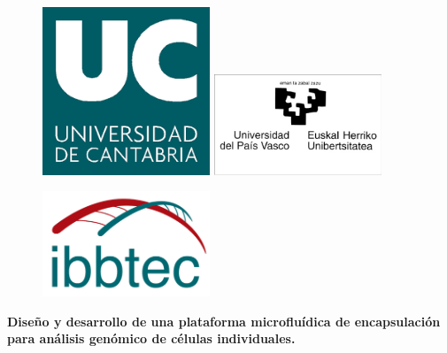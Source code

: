 \begin{titlepage}

    \begin{center}
    \vspace*{0.5in}
    
    \begin{figure}[htb]
        \begin{center}
            
            \includegraphics[width=5cm]{00_portada/UC.png}
            \hspace{2mm}
            \includegraphics[width=5cm]{00_portada/upv.jpg}   
            
            \vspace{2mm}
             
            \includegraphics[width=5cm]{00_portada/ibbtec.png}
            
        \end{center}
    \end{figure}
    
    \vspace*{0.4in}
    
    \begin{LARGE}
        \textbf{Diseño y desarrollo de una plataforma microfluídica de encapsulación para análisis genómico de células individuales.} \\
    \end{LARGE}
    

\end{center}
\end{titlepage}
